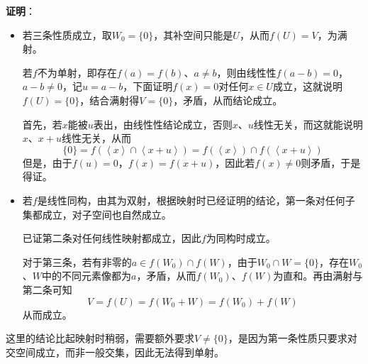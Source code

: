 \documentclass[a4paper,UTF8,fontset=windows,AutoFakeBold]{ctexart}
\newcommand*{\note}{\noindent *}
\newcommand{\proo}[1]{{\vspace{5pt}\kaishu\noindent\textbf{证明}：\vspace{-3pt}
\begin{compactitem}
    \item[] #1
\end{compactitem}
}}
\begin{document}
\proo{
    \begin{itemize}
        \item 若三条性质成立，取$W_0=\{0\}$，其补空间只能是$U$，从而$f(U)=V$，为满射。
        
        若$f$不为单射，即存在$f(a)=f(b)$、$a\ne b$，则由线性性$f(a-b)=0$，$a-b\ne 0$，记$u=a-b$，下面证明$f(x)=0$对任何$x\in U$成立，这就说明$f(U)=\{0\}$，结合满射得$V=\{0\}$，矛盾，从而结论成立。

        首先，若$x$能被$u$表出，由线性性结论成立，否则$x$、$u$线性无关，而这就能说明$x$、$x+u$线性无关，从而
        $$\{0\}=f(\left<x\right>\cap\left<x+u\right>)=f(\left<x\right>)\cap f(\left<x+u\right>)$$
        但是，由于$f(u)=0$，$f(x)=f(x+u)$，因此若$f(x)\ne0$则矛盾，于是得证。

        \item 若$f$是线性同构，由其为双射，根据映射时已经证明的结论，第一条对任何子集都成立，对子空间也自然成立。
        
        已证第二条对任何线性映射都成立，因此$f$为同构时成立。

        对于第三条，若有非零的$a\in f(W_0)\cap f(W)$，由于$W_0\cap W=\{0\}$，存在$W_0$、$W$中的不同元素像都为$a$，矛盾，从而$f(W_0)$、$f(W)$为直和。再由满射与第二条可知
        $$V=f(U)=f(W_0+W)=f(W_0)+f(W)$$
        从而成立。
    \end{itemize}
}

\note 这里的结论比起映射时稍弱，需要额外要求$V\ne\{0\}$，是因为第一条性质只要求对交空间成立，而非一般交集，因此无法得到单射。

\
\end{document}
